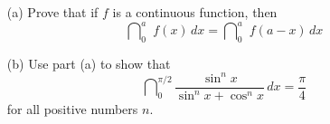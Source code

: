 \documentclass{sebase}
\begin{document}
\begin{Example}[1]
\thinspace 
{}

\begin{enumerate}
\item[(a)] 
%
Prove that if $f$ is a continuous function, then 
\begin{equation*}
\dint\nolimits_{0}^{a}\,\,f(x)\,dx=\dint\nolimits_{0}^{a}\,\,f(a-x)\,dx
\end{equation*}

\item[(b)] 
%
Use part (a) to show that 
\begin{equation*}
\dint\nolimits_{0}^{\pi /2}\frac{\sin ^{n}x}{\sin ^{n}x+\cos ^{n}x}\,dx=%
\frac{\pi }{4}
\end{equation*}%
for all positive numbers $n$.
\end{enumerate}
\end{Example}
\end{document}
